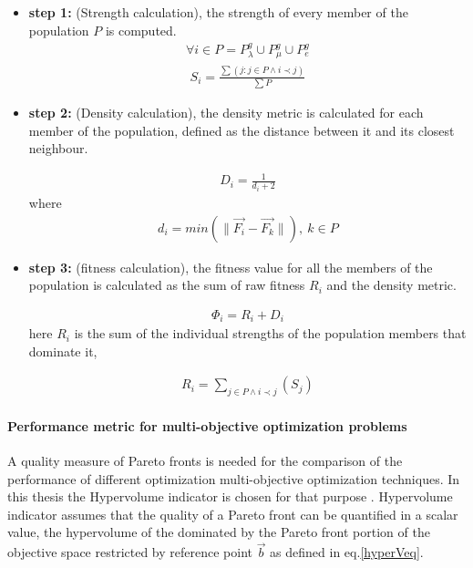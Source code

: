 \begin{itemize}
\item[]{\bf step 1:}  (Strength calculation), the strength of every member of the population $P$ is computed. 
\begin{eqnarray}
	\nonumber
	\forall i \in P = P_{\lambda}^g \cup P_{\mu}^g \cup P_{e}^g  
\end{eqnarray}
\begin{eqnarray}
	S_i = \frac{\sum(j : j \in P \wedge i \prec j)} {\sum P} 
\end{eqnarray}

\item[]{\bf step 2:}  (Density calculation), the density metric is calculated for each member of the population, defined as the distance between it and its closest neighbour.

\begin{eqnarray}
	D_i = \frac{1} {d_i+2} 
\end{eqnarray}
where
\begin{eqnarray}
	\nonumber
	d_i= min (\parallel \vec{F_i} - \vec{F_k} \parallel), ~ k \in P  
\end{eqnarray}


\item[]{\bf step 3:}  (fitness calculation), the fitness value for all the members of the population is calculated as the sum of raw fitness $R_i$ and the density metric.

\begin{eqnarray}
	\Phi_i = R_i+D_i
\label{SPEAIIeq}
\end{eqnarray}
here $R_i$ is the sum of the individual strengths of the population members that dominate it,
  
\begin{eqnarray}
	\nonumber
	R_i=\sum _{j \in P \wedge i \prec j}(S_j)  
\end{eqnarray}  
\end{itemize}

\paragraph{Performance metric for multi-objective optimization problems}
A quality measure of Pareto fronts is needed for the comparison of the performance of different optimization multi-objective optimization techniques. In this thesis the Hypervolume indicator is chosen for that purpose \cite{zbt2007a}. Hypervolume indicator assumes that the quality of a Pareto front can be quantified in a scalar value, the hypervolume of the dominated by the Pareto front portion of the objective space restricted by reference point $\vec{b}$ as defined in eq.\ref{hyperVeq}. 

